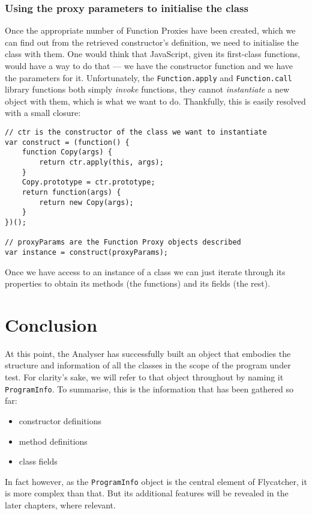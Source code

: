 \subsubsection{Using the proxy parameters to initialise the class}
Once the appropriate number of Function Proxies have been created, which we can find out from the retrieved constructor's definition, we need to initialise the class with them. One would think that JavaScript, given its first-class functions, would have a way to do that --- we have the constructor function and we have the parameters for it. Unfortunately, the \texttt{Function.apply} and \texttt{Function.call} library functions both simply \emph{invoke} functions, they cannot \emph{instantiate} a new object with them, which is what we want to do. Thankfully, this is easily resolved with a small closure:

\begin{lstlisting}
// ctr is the constructor of the class we want to instantiate
var construct = (function() {
    function Copy(args) {
        return ctr.apply(this, args);
    }
    Copy.prototype = ctr.prototype;
    return function(args) {
        return new Copy(args);
    }
})();

// proxyParams are the Function Proxy objects described
var instance = construct(proxyParams);
\end{lstlisting}

Once we have access to an instance of a class we can just iterate through its properties to obtain its methods (the functions) and its fields (the rest).

\section{Conclusion}
At this point, the Analyser has successfully built an object that embodies the structure and information of all the classes in the scope of the program under test. For clarity's sake, we will refer to that object throughout by naming it \texttt{ProgramInfo}. To summarise, this is the information that has been gathered so far:

\begin{itemize}
   \item constructor definitions \checkmark
   \item method definitions \checkmark
   \item class fields \checkmark
\end{itemize}

In fact however, as the \texttt{ProgramInfo} object is the central element of \textsf{Flycatcher}, it is more complex than that. But its additional features will be revealed in the later chapters, where relevant.